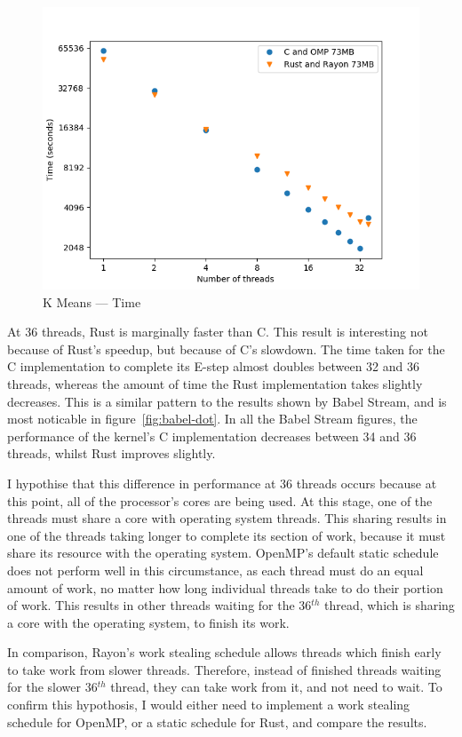 \begin{figure}[h]
\centering
\includegraphics[width=.9\linewidth]{figs/kmeans/time.png}
\caption{K Means --- Time}\label{fig:kmeans-time}
\end{figure}

At 36 threads, Rust is marginally faster than C. This result is interesting not because of Rust's speedup, but because of C's slowdown. The time taken for the C implementation to complete its E-step almost doubles between 32 and 36 threads, whereas the amount of time the Rust implementation takes slightly decreases. This is a similar pattern to the results shown by Babel Stream, and is most noticable in figure~\ref{fig:babel-dot}.
In all the Babel Stream figures, the performance of the kernel's C implementation decreases between 34 and 36 threads, whilst Rust improves slightly.

I hypothise that this difference in performance at 36 threads occurs because at this point, all of the processor's cores are being used. At this stage, one of the threads must share a core with operating system threads. This sharing results in one of the threads taking longer to complete its section of work, because it must share its resource with the operating system. OpenMP's default static schedule does not perform well in this circumstance, as each thread must do an equal amount of work, no matter how long individual threads take to do their portion of work.
This results in other threads waiting for the 36$^{th}$ thread, which is sharing a core with the operating system, to finish its work.

In comparison, Rayon's work stealing schedule allows threads which finish early to take work from slower threads. Therefore, instead of finished threads waiting for the slower 36$^{th}$ thread, they can take work from it, and not need to wait. To confirm this hypothosis, I would either need to implement a work stealing schedule for OpenMP, or a static schedule for Rust, and compare the results.

